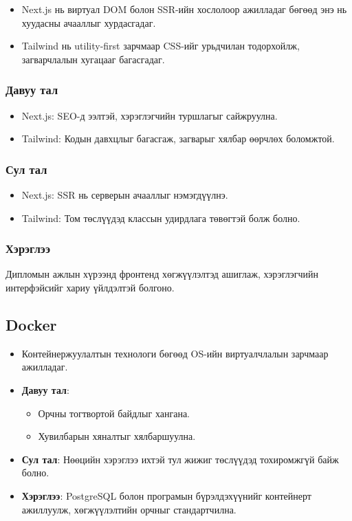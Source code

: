 \begin{itemize}
    \item Next.js нь виртуал DOM болон SSR-ийн хослолоор ажилладаг бөгөөд энэ нь хуудасны ачааллыг хурдасгадаг.
    \item Tailwind нь utility-first зарчмаар CSS-ийг урьдчилан тодорхойлж, загварчлалын хугацааг багасгадаг.
\end{itemize}

\subsubsection{Давуу тал}
\begin{itemize}
    \item Next.js: SEO-д ээлтэй, хэрэглэгчийн туршлагыг сайжруулна.
    \item Tailwind: Кодын давхцлыг багасгаж, загварыг хялбар өөрчлөх боломжтой.
\end{itemize}

\subsubsection{Сул тал}
\begin{itemize}
    \item Next.js: SSR нь серверын ачааллыг нэмэгдүүлнэ.
    \item Tailwind: Том төслүүдэд классын удирдлага төвөгтэй болж болно.
\end{itemize}

\subsubsection{Хэрэглээ}
Дипломын ажлын хүрээнд фронтенд хөгжүүлэлтэд ашиглаж, хэрэглэгчийн интерфэйсийг хариу үйлдэлтэй болгоно.

\subsection{Docker}
\begin{itemize}
    \item Контейнержуулалтын технологи бөгөөд OS-ийн виртуалчлалын зарчмаар ажилладаг.
    \item \textbf{Давуу тал}: 
    \begin{itemize}
        \item Орчны тогтвортой байдлыг хангана.
        \item Хувилбарын хяналтыг хялбаршуулна.
    \end{itemize}
    \item \textbf{Сул тал}: Нөөцийн хэрэглээ ихтэй тул жижиг төслүүдэд тохиромжгүй байж болно.
    \item \textbf{Хэрэглээ}: PostgreSQL болон програмын бүрэлдэхүүнийг контейнерт ажиллуулж, хөгжүүлэлтийн орчныг стандартчилна.
\end{itemize}

